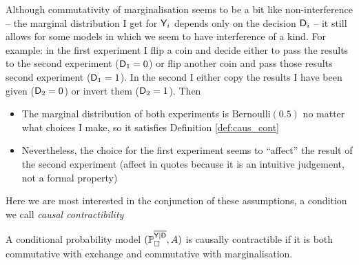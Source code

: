Although commutativity of marginalisation seems to be a bit like non-interference -- the marginal distribution I get for $\mathsf{Y}_i$ depends only on the decision $\mathsf{D}_i$ -- it still allows for some models in which we seem to have interference of a kind. For example: in the first experiment I flip a coin and decide either to pass the results to the second experiment ($\mathsf{D}_1=0$) or flip another coin and pass those results second experiment ($\mathsf{D}_1=1$). In the second I either copy the results I have been given ($\mathsf{D}_2=0$) or invert them ($\mathsf{D}_2=1$). Then
\begin{itemize}
    \item The marginal distribution of both experiments is $\text{Bernoulli}(0.5)$ no matter what choices I make, so it satisfies Definition \ref{def:caus_cont}
    \item Nevertheless, the choice for the first experiment seems to ``affect'' the result of the second experiment (affect in quotes because it is an intuitive judgement, not a formal property)
\end{itemize}

Here we are most interested in the conjunction of these assumptions, a condition we call \emph{causal contractibility}

\begin{definition}
A conditional probability model $(\mathbb{P}_{\square}^{\overline{\mathsf{Y}|\mathsf{D}}},A)$ is causally contractible if it is both commutative with exchange and commutative with marginalisation.
\end{definition}


